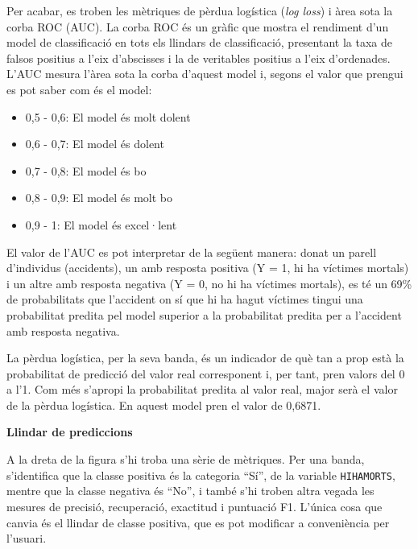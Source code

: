 \documentclass[12pt,longbibliography]{article}
\theoremstyle{definition}
\theoremstyle{remark}
\begin{document}
Per acabar, es troben les mètriques de pèrdua logística (\emph{log loss}) i àrea sota la corba ROC (AUC). La corba ROC és un gràfic que mostra el rendiment d'un model de classificació en tots els llindars de classificació, presentant la taxa de falsos positius a l'eix d'abscisses i la de veritables positius a l'eix d'ordenades. L'AUC mesura l'àrea sota la corba d'aquest model i, segons el valor que prengui es pot saber com és el model:



\begin{itemize}

\item 0,5 - 0,6: El model és molt dolent

\item 0,6 - 0,7: El model és dolent

\item 0,7 - 0,8: El model és bo

\item 0,8 - 0,9: El model és molt bo

\item 0,9 - 1: El model és excel·lent

\end{itemize}



El valor de l’AUC es pot interpretar de la següent manera: donat un parell d’individus (accidents), un amb resposta positiva (Y = 1, hi ha víctimes mortals) i un altre amb resposta negativa (Y = 0, no hi ha víctimes mortals), es té un 69\% de probabilitats que l'accident on sí que hi ha hagut víctimes tingui una probabilitat predita pel model superior a la probabilitat predita per a l'accident amb resposta negativa.



La pèrdua logística, per la seva banda, és un indicador de què tan a prop està la probabilitat de predicció del valor real corresponent i, per tant, pren valors del 0 a l'1. Com més s'apropi la probabilitat predita al valor real, major serà el valor de la pèrdua logística. En aquest model pren el valor de 0,6871.



\textbf{Llindar de prediccions}



A la dreta de la figura s'hi troba una sèrie de mètriques. Per una banda, s'identifica que la classe positiva és la categoria ``Sí'', de la variable \texttt{HIHAMORTS}, mentre que la classe negativa és ``No'', i també s'hi troben altra vegada les mesures de precisió, recuperació, exactitud i puntuació F1. L'única cosa que canvia és el llindar de classe positiva, que es pot modificar a conveniència per l'usuari.
\end{document}
